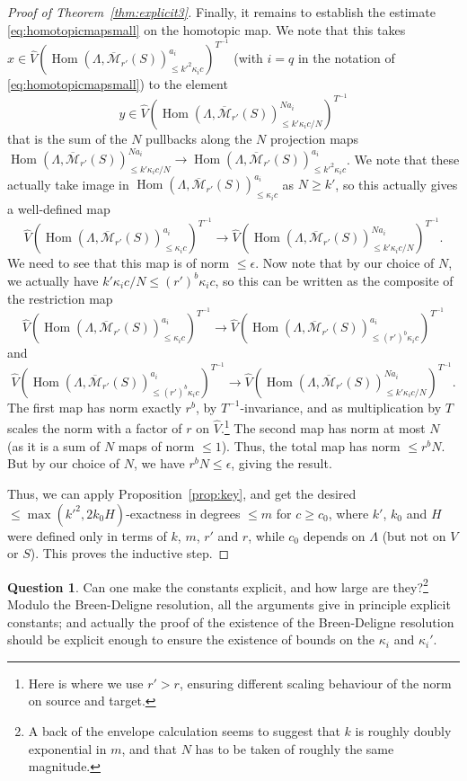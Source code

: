 \documentclass[11pt]{amsbook}
\DeclareMathOperator{\Hom}{Hom}
\numberwithin{equation}{section}
\numberwithin{theorem}{section}
\theoremstyle{definition}
\newtheorem{question}[theorem]{Question}
\begin{document}
\begin{proof}[Proof of Theorem~\ref{thm:explicit3}]
Finally, it remains to establish the estimate \eqref{eq:homotopicmapsmall} on the homotopic map. We note that this takes $x\in \widehat{V}(\Hom(\Lambda,\overline{\mathcal M}_{r'}(S))_{\leq k'^2\kappa_ic}^{a_i})^{T^{-1}}$ (with $i=q$ in the notation of \eqref{eq:homotopicmapsmall}) to the element
\[
y\in \widehat{V}(\Hom(\Lambda,\overline{\mathcal M}_{r'}(S))_{\leq k'\kappa_ic/N}^{Na_i})^{T^{-1}}
\]
that is the sum of the $N$ pullbacks along the $N$ projection maps $\Hom(\Lambda,\overline{\mathcal M}_{r'}(S))_{\leq k'\kappa_ic/N}^{Na_i}\to \Hom(\Lambda,\overline{\mathcal M}_{r'}(S))_{\leq k'^2\kappa_ic}^{a_i}$. We note that these actually take image in $\Hom(\Lambda,\overline{\mathcal M}_{r'}(S))_{\leq \kappa_ic}^{a_i}$ as $N\geq k'$, so this actually gives a well-defined map
\[
\widehat{V}(\Hom(\Lambda,\overline{\mathcal M}_{r'}(S))_{\leq \kappa_ic}^{a_i})^{T^{-1}}\to \widehat{V}(\Hom(\Lambda,\overline{\mathcal M}_{r'}(S))_{\leq k'\kappa_ic/N}^{Na_i})^{T^{-1}}.
\]
We need to see that this map is of norm $\leq \epsilon$. Now note that by our choice of $N$, we actually have $k'\kappa_ic/N\leq (r')^b \kappa_ic$, so this can be written as the composite of the restriction map
\[
\widehat{V}(\Hom(\Lambda,\overline{\mathcal M}_{r'}(S))_{\leq \kappa_ic}^{a_i})^{T^{-1}}\to \widehat{V}(\Hom(\Lambda,\overline{\mathcal M}_{r'}(S))_{\leq (r')^b \kappa_ic}^{a_i})^{T^{-1}}
\]
and
\[
\widehat{V}(\Hom(\Lambda,\overline{\mathcal M}_{r'}(S))_{\leq (r')^b \kappa_ic}^{a_i})^{T^{-1}}\to \widehat{V}(\Hom(\Lambda,\overline{\mathcal M}_{r'}(S))_{\leq k'\kappa_ic/N}^{Na_i})^{T^{-1}}.
\]
The first map has norm exactly $r^b$, by $T^{-1}$-invariance, and as multiplication by $T$ scales the norm with a factor of $r$ on $\widehat{V}$.\footnote{Here is where we use $r'>r$, ensuring different scaling behaviour of the norm on source and target.} The second map has norm at most $N$ (as it is a sum of $N$ maps of norm $\leq 1$). Thus, the total map has norm $\leq r^bN$. But by our choice of $N$, we have $r^bN\leq \epsilon$, giving the result.

Thus, we can apply Proposition~\ref{prop:key}, and get the desired $\leq \max(k'^2,2k_0H)$-exactness in degrees $\leq m$ for $c\geq c_0$, where $k'$, $k_0$ and $H$ were defined only in terms of $k$, $m$, $r'$ and $r$, while $c_0$ depends on $\Lambda$ (but not on $V$ or $S$). This proves the inductive step.
\end{proof}

\begin{question} Can one make the constants explicit, and how large are they?\footnote{A back of the envelope calculation seems to suggest that $k$ is roughly doubly exponential in $m$, and that $N$ has to be taken of roughly the same magnitude.} Modulo the Breen-Deligne resolution, all the arguments give in principle explicit constants; and actually the proof of the existence of the Breen-Deligne resolution should be explicit enough to ensure the existence of bounds on the $\kappa_i$ and $\kappa_i'$.
\end{question}
\end{document}
